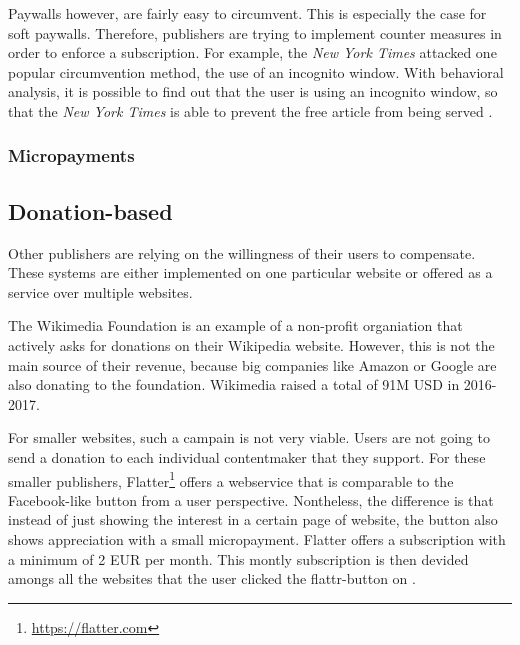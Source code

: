 
Paywalls however, are fairly easy to circumvent. This is especially the case for soft paywalls. Therefore, publishers are trying to implement counter measures in order to enforce a subscription. For example, the \textit{New York Times} attacked one popular circumvention method, the use of an incognito window. With behavioral analysis, it is possible to find out that the user is using an incognito window, so that the \textit{New York Times} is able to prevent the free article from being served \cite{troupson2015yes}.  

\subsubsection{Micropayments}



\subsection{Donation-based}

Other publishers are relying on the willingness of their users to compensate. These systems are either implemented on one particular website or offered as a service over multiple websites. 

The Wikimedia Foundation is an example of a non-profit organiation that actively asks for donations on their Wikipedia website. However, this is not the main source of their revenue, because big companies like Amazon or Google are also donating to the foundation. Wikimedia raised a total of 91M USD in 2016-2017. \cite{wikimediadonation}

For smaller websites, such a campain is not very viable. Users are not going to send a donation to each individual contentmaker that they support. For these smaller publishers, Flatter\footnote{\url{https://flatter.com}} offers a webservice that is comparable to the Facebook-like button from a user perspective. Nontheless, the difference is that instead of just showing the interest in a certain page of website, the button also shows appreciation with a small micropayment. Flatter offers a subscription with a minimum of 2 EUR per month. This montly subscription is then devided amongs all the websites that the user clicked the flattr-button on \cite{loll2010flattr}.







